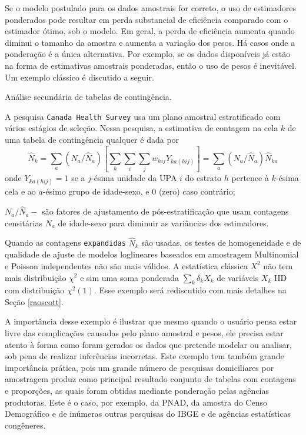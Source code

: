 \documentclass[]{book}
\theoremstyle{definition}
\theoremstyle{definition}
\theoremstyle{definition}
\theoremstyle{remark}
\let\BeginKnitrBlock\begin \let\EndKnitrBlock\end
\begin{document}
Se o modelo postulado para os dados amostrais for correto, o uso de
estimadores ponderados pode resultar em perda substancial de eficiência
comparado com o estimador ótimo, sob o modelo. Em geral, a perda de
eficiência aumenta quando diminui o tamanho da amostra e aumenta a
variação dos pesos. Há casos onde a ponderação é a única alternativa.
Por exemplo, se os dados disponíveis já estão na forma de estimativas
amostrais ponderadas, então o uso de pesos é inevitável. Um exemplo
clássico é discutido a seguir.

\BeginKnitrBlock{example}
\protect\hypertarget{exm:Analisec}{}{\label{exm:Analisec} }Análise
secundária de tabelas de contingência.
\EndKnitrBlock{example}

A pesquisa \texttt{Canada\ Health\ Survey} usa um plano amostral
estratificado com vários estágios de seleção. Nessa pesquisa, a
estimativa de contagem na cela \(k\) de uma tabela de contingência
qualquer é dada por \[
\widehat{N}_{k}=\sum_{a}\left( N_{a}/\widehat{N}_{a}\right) \left[
\sum_{h}\sum_{i}\sum_{j}w_{hij}Y_{ka\left( hij\right) }\right]
=\sum_{a}\left( N_{a}/\widehat{N}_{a}\right) \widehat{N}_{ka} 
\] onde \(Y_{ka\left( hij\right)}=1\) se a \(j\)-ésima unidade da UPA
\(i\) do estrato \(h\) pertence à \(k\)-ésima cela e ao \(a\)-ésimo
grupo de idade-sexo, e \(0\) (zero) caso contrário;

\(N_{a}/\widehat{N}_{a}-\) são fatores de ajustamento de
pós-estratificação que usam contagens censitárias \(N_{a}\) de
idade-sexo para diminuir as variâncias dos estimadores.

Quando as contagens \texttt{expandidas} \(\widehat{N}_{k}\) são usadas,
os testes de homogeneidade e de qualidade de ajuste de modelos
loglineares baseados em amostragem Multinomial e Poisson independentes
não são mais válidos. A estatística clássica \(X^{2}\) não tem mais
distribuição \(\chi ^{2}\) e sim uma soma ponderada
\(\sum_{k}\delta _{k}X_{k}\) de variáveis \(X_{k}\) IID com distribuição
\(\chi ^{2}\left( 1\right)\). Esse exemplo será rediscutido com mais
detalhes na Seção \ref{raoscott}.

A importância desse exemplo é ilustrar que mesmo quando o usuário pensa
estar livre das complicações causadas pelo plano amostral e pesos, ele
precisa estar atento à forma como foram gerados os dados que pretende
modelar ou analisar, sob pena de realizar inferências incorretas. Este
exemplo tem também grande importância prática, pois um grande número de
pesquisas domiciliares por amostragem produz como principal resultado
conjunto de tabelas com contagens e proporções, as quais foram obtidas
mediante ponderação pelas agências produtoras. Este é o caso, por
exemplo, da PNAD, da amostra do Censo Demográfico e de inúmeras outras
pesquisas do IBGE e de agências estatísticas congêneres.
\end{document}
